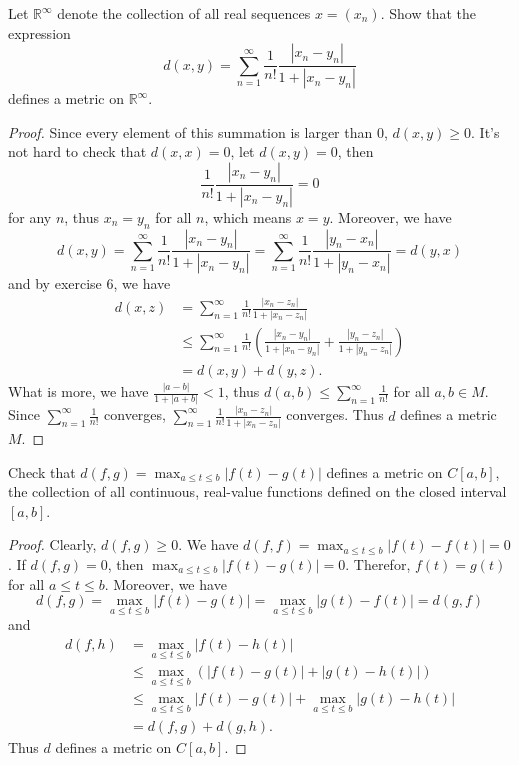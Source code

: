 \documentclass[12pt, a4paper]{article}
\theoremstyle{plain}
\newcommand{\R}{\mathbb{R}}
\begin{document}
\begin{exercise}{11}
Let $\R^\infty$ denote the collection of all real sequences $x=(x_n)$. Show that the expression 
\[
d(x,y)=\sum_{n=1}^{\infty}{\frac{1}{n!}\frac{|x_n-y_n|}{1+|x_n-y_n|}}
\]
defines a metric on $\R^\infty$.
\end{exercise}
	\begin{proof}
	Since every element of this summation is larger than $0$, $d(x,y)\geq 0$. It's not hard to check that $d(x,x)=0$, let $d(x,y)=0$, then 
	\[
	\frac{1}{n!}\frac{|x_n-y_n|}{1+|x_n-y_n|}=0
	\]
	for any $n$, thus $x_n=y_n$ for all $n$, which means $x=y$. Moreover, we have
	\[
	d(x,y)=\sum_{n=1}^{\infty}{\frac{1}{n!}\frac{|x_n-y_n|}{1+|x_n-y_n|}}=\sum_{n=1}^{\infty}{\frac{1}{n!}\frac{|y_n-x_n|}{1+|y_n-x_n|}}=d(y,x)
	\]
	and by exercise 6, we have
	\begin{align*}
	d(x,z)&=\sum_{n=1}^{\infty}{\frac{1}{n!}\frac{|x_n-z_n|}{1+|x_n-z_n|}}\\
	&\leq \sum_{n=1}^{\infty}{\frac{1}{n!}(\frac{|x_n-y_n|}{1+|x_n-y_n|}+\frac{|y_n-z_n|}{1+|y_n-z_n|})}\\
	&= d(x,y)+d(y,z).
	\end{align*}
	What is more, we have $\frac{|a-b|}{1+|a+b|}<1$, thus $d(a,b)\leq \sum_{n=1}^{\infty}{\frac{1}{n!}}$ for all $a,b\in M$. Since $\sum_{n=1}^\infty \frac{1}{n!}$ converges, $\sum_{n=1}^{\infty}{\frac{1}{n!}\frac{|x_n-z_n|}{1+|x_n-z_n|}}$ converges. Thus $d$ defines a metric $M$.
	\end{proof}
\begin{exercise}{12}
Check that $d(f,g)=\max_{a\leq t\leq b}{|f(t)-g(t)|}$ defines a metric on $C[a,b]$, the collection of all continuous, real-value functions defined on the closed interval $[a,b]$.
\end{exercise}
	\begin{proof}
	Clearly, $d(f,g)\geq 0$. We have $d(f,f)=\max_{a\leq t\leq b}|f(t)-f(t)|=0$. If $d(f,g)=0$, then $\max_{a\leq t\leq b}|f(t)-g(t)|=0$. Therefor, $f(t)=g(t)$ for all $a\leq t\leq b$. Moreover, we have
	\[
	d(f,g)=\max_{a\leq t\leq b}|f(t)-g(t)|=\max_{a\leq t\leq b}|g(t)-f(t)|=d(g,f)
	\]
	and
	\begin{align*}
	d(f,h)&=\max_{a\leq t\leq b}|f(t)-h(t)|\\
	&\leq \max_{a\leq t\leq b}(|f(t)-g(t)|+|g(t)-h(t)|)\\
	&\leq \max_{a\leq t\leq b}|f(t)-g(t)|+\max_{a\leq t\leq b}|g(t)-h(t)|\\
	&= d(f,g)+d(g,h).
	\end{align*}
	Thus $d$ defines a metric on $C[a,b]$.
	\end{proof}
\end{document}
